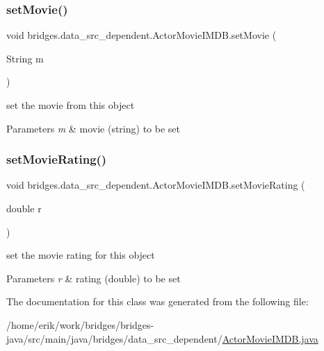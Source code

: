\subsubsection{\texorpdfstring{set\+Movie()}{setMovie()}}
{\footnotesize\ttfamily void bridges.\+data\+\_\+src\+\_\+dependent.\+Actor\+Movie\+I\+M\+D\+B.\+set\+Movie (\begin{DoxyParamCaption}\item[{String}]{m }\end{DoxyParamCaption})}



set the movie from this object 


\begin{DoxyParams}{Parameters}
{\em m} & movie (string) to be set \\
\hline
\end{DoxyParams}
\mbox{\label{classbridges_1_1data__src__dependent_1_1_actor_movie_i_m_d_b_a770bf71b928f997301aab76af5c9b886}} 
\subsubsection{\texorpdfstring{set\+Movie\+Rating()}{setMovieRating()}}
{\footnotesize\ttfamily void bridges.\+data\+\_\+src\+\_\+dependent.\+Actor\+Movie\+I\+M\+D\+B.\+set\+Movie\+Rating (\begin{DoxyParamCaption}\item[{double}]{r }\end{DoxyParamCaption})}



set the movie rating for this object 


\begin{DoxyParams}{Parameters}
{\em r} & rating (double) to be set \\
\hline
\end{DoxyParams}


The documentation for this class was generated from the following file\+:\begin{DoxyCompactItemize}
\item 
/home/erik/work/bridges/bridges-\/java/src/main/java/bridges/data\+\_\+src\+\_\+dependent/\hyperlink{_actor_movie_i_m_d_b_8java}{Actor\+Movie\+I\+M\+D\+B.\+java}\end{DoxyCompactItemize}
